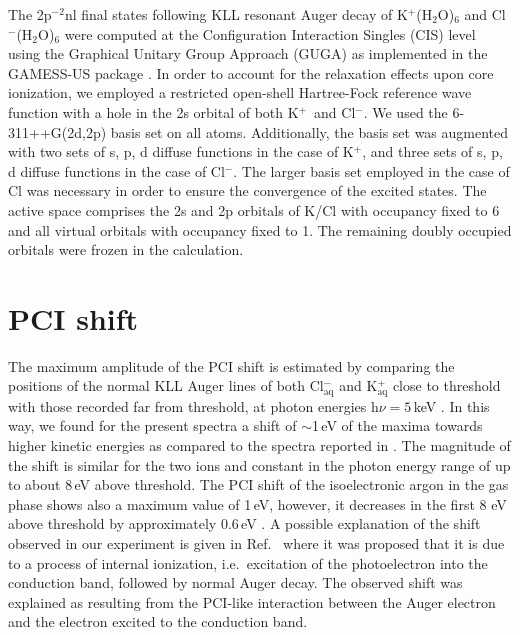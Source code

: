 \documentclass[journal=jpclcd,manuscript=letter]{achemso}
\begin{document}
The 2p$^{-2}$nl final states following KLL resonant Auger decay of K$^{+}$(H$_2$O)$_6$ and Cl$^{-}$(H$_2$O)$_6$ were computed at the Configuration Interaction Singles (CIS) level using the Graphical Unitary Group Approach (GUGA) as implemented in the GAMESS-US package \citep{GUGA_PhysScr_21,GUGA_JCP_70,GUS}. In order to account for the relaxation effects upon core ionization, we employed a restricted open-shell Hartree-Fock reference wave function with a hole in the 2s orbital of both K$^{+}$~and Cl$^{-}$.  We used the 6-311++G(2d,2p) basis set \citep{Krishnan80:650,McLean80:5639,Blaudeau97:5016} on all atoms. Additionally, the basis set was augmented with two sets of s, p, d diffuse functions in the case of K$^{+}$, and three sets of s, p, d diffuse functions in the case of Cl$^{-}$. The larger basis set employed in the case of Cl was necessary in order to ensure the convergence of the excited states. The active space comprises the 2s and 2p orbitals of K/Cl with occupancy fixed to 6 and all virtual orbitals with occupancy fixed to 1. The remaining doubly occupied orbitals were frozen in the calculation. \citep{mosnier16:061401}

\section{PCI shift}
The maximum amplitude of the PCI shift is estimated by comparing the positions of the normal KLL Auger lines of both Cl$^{-}_{\text{aq}}$ and K$^{+}_{\text{aq}}$ close to threshold with those recorded far from threshold, at photon energies h$\nu = 5$\,keV \citep{ceolin17:263003}. In this way, we found for the present spectra a shift of $\sim$1\,eV of the maxima towards higher kinetic energies as compared to the spectra reported in \citep{ceolin17:263003}. The magnitude of the shift is similar for the two ions and constant in the photon energy range of up to about 8\,eV above threshold. The PCI shift of the isoelectronic argon in the gas phase shows also a maximum value of 1\,eV, however, it decreases in the first 8 eV above threshold by approximately 0.6\,eV \citep{guillemin15:012503}. A possible explanation of the shift observed in our experiment is given in Ref.\ \cite{tchaplyguine07:124314} where it was proposed that it is due to a process of internal ionization, i.e.\ excitation of the photoelectron into the conduction band, followed by normal Auger decay. The observed shift was explained as resulting from the PCI-like interaction between the Auger electron and the electron excited to the conduction band.
\end{document}
